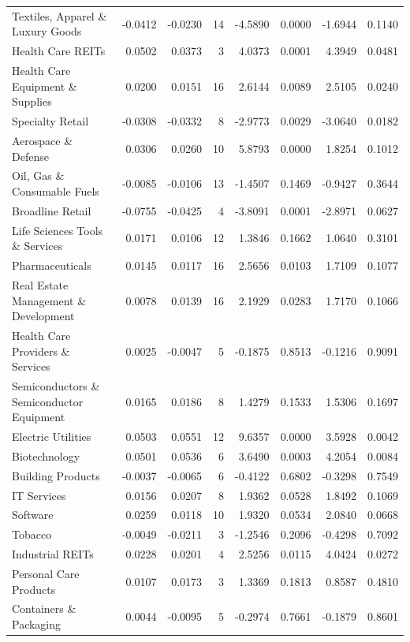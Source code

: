 \begin{table}
\begin{tabular}{lrrrrrrr}
Textiles, Apparel \& Luxury Goods & -0.0412 & -0.0230 & 14 & -4.5890 & 0.0000 & -1.6944 & 0.1140 \\
Health Care REITs & 0.0502 & 0.0373 & 3 & 4.0373 & 0.0001 & 4.3949 & 0.0481 \\
Health Care Equipment \& Supplies & 0.0200 & 0.0151 & 16 & 2.6144 & 0.0089 & 2.5105 & 0.0240 \\
Specialty Retail & -0.0308 & -0.0332 & 8 & -2.9773 & 0.0029 & -3.0640 & 0.0182 \\
Aerospace \& Defense & 0.0306 & 0.0260 & 10 & 5.8793 & 0.0000 & 1.8254 & 0.1012 \\
Oil, Gas \& Consumable Fuels & -0.0085 & -0.0106 & 13 & -1.4507 & 0.1469 & -0.9427 & 0.3644 \\
Broadline Retail & -0.0755 & -0.0425 & 4 & -3.8091 & 0.0001 & -2.8971 & 0.0627 \\
Life Sciences Tools \& Services & 0.0171 & 0.0106 & 12 & 1.3846 & 0.1662 & 1.0640 & 0.3101 \\
Pharmaceuticals & 0.0145 & 0.0117 & 16 & 2.5656 & 0.0103 & 1.7109 & 0.1077 \\
Real Estate Management \& Development & 0.0078 & 0.0139 & 16 & 2.1929 & 0.0283 & 1.7170 & 0.1066 \\
Health Care Providers \& Services & 0.0025 & -0.0047 & 5 & -0.1875 & 0.8513 & -0.1216 & 0.9091 \\
Semiconductors \& Semiconductor Equipment & 0.0165 & 0.0186 & 8 & 1.4279 & 0.1533 & 1.5306 & 0.1697 \\
Electric Utilities & 0.0503 & 0.0551 & 12 & 9.6357 & 0.0000 & 3.5928 & 0.0042 \\
Biotechnology & 0.0501 & 0.0536 & 6 & 3.6490 & 0.0003 & 4.2054 & 0.0084 \\
Building Products & -0.0037 & -0.0065 & 6 & -0.4122 & 0.6802 & -0.3298 & 0.7549 \\
IT Services & 0.0156 & 0.0207 & 8 & 1.9362 & 0.0528 & 1.8492 & 0.1069 \\
Software & 0.0259 & 0.0118 & 10 & 1.9320 & 0.0534 & 2.0840 & 0.0668 \\
Tobacco & -0.0049 & -0.0211 & 3 & -1.2546 & 0.2096 & -0.4298 & 0.7092 \\
Industrial REITs & 0.0228 & 0.0201 & 4 & 2.5256 & 0.0115 & 4.0424 & 0.0272 \\
Personal Care Products & 0.0107 & 0.0173 & 3 & 1.3369 & 0.1813 & 0.8587 & 0.4810 \\
Containers \& Packaging & 0.0044 & -0.0095 & 5 & -0.2974 & 0.7661 & -0.1879 & 0.8601 \\

\end{tabular}
\end{table}
